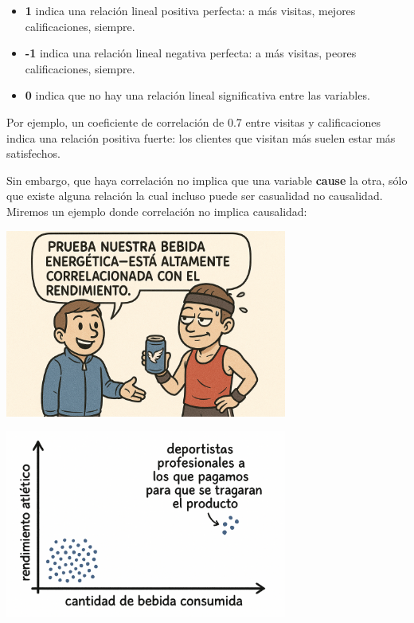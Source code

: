 \documentclass[
  spanish,
  letterpaper,
  DIV=11,
  numbers=noendperiod]{scrreprt}
\providecommand{\tightlist}{%
  \setlength{\itemsep}{0pt}\setlength{\parskip}{0pt}}
\begin{document}
\begin{itemize}
\tightlist
\item
  \textbf{1} indica una relación lineal positiva perfecta: a más
  visitas, mejores calificaciones, siempre.\\
\item
  \textbf{-1} indica una relación lineal negativa perfecta: a más
  visitas, peores calificaciones, siempre.\\
\item
  \textbf{0} indica que no hay una relación lineal significativa entre
  las variables.
\end{itemize}

Por ejemplo, un coeficiente de correlación de 0.7 entre visitas y
calificaciones indica una relación positiva fuerte: los clientes que
visitan más suelen estar más satisfechos.

Sin embargo, que haya correlación no implica que una variable
\textbf{cause} la otra, sólo que existe alguna relación la cual incluso
puede ser casualidad no causalidad. Miremos un ejemplo donde correlación
no implica causalidad:

\begin{center}
\includegraphics[width=3.64583in,height=\textheight,keepaspectratio]{img/correlacion_1.png}
\end{center}

\begin{center}
\includegraphics[width=3.64583in,height=\textheight,keepaspectratio]{img/correlacion_2.png}
\end{center}
\end{document}
